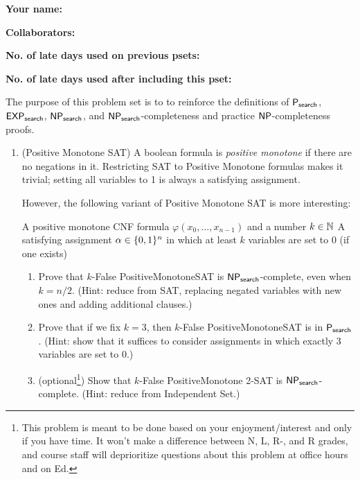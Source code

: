 \documentclass[11pt]{article}
\begin{document}


\textbf{Your name: }

\textbf{Collaborators: }

\textbf{No. of late days used on previous psets: }

\textbf{No. of late days used after including this pset: }

\vspace{1em}

\noindent The purpose of this problem set is to to reinforce the definitions of $\mathsf{P_{search}}$, $\mathsf{EXP_{search}}$, $\mathsf{NP_{search}}$, and $\mathsf{NP_{search}}$-completeness and practice $\mathsf{NP}$-completeness proofs. 

\begin{enumerate}
    \item (Positive Monotone SAT)
    A boolean formula is {\em positive monotone} if there are no negations in it.  Restricting SAT to Positive Monotone formulas makes it trivial; setting all variables to 1 is always a satisfying assignment.
    
    However, the following variant of Positive Monotone SAT is more interesting:
    
        {A positive monotone CNF formula $\varphi(x_0,\ldots,x_{n-1})$ and a number $k\in \mathbb{N}$}
        {A satisfying assignment $\alpha\in\{0,1\}^n$ in which at least $k$ variables are set to 0 (if one exists)}
    
    \begin{enumerate}
        \item Prove that $k$-False PositiveMonotoneSAT is $\mathsf{NP_{search}}$-complete, even when $k=n/2$.  (Hint: reduce from SAT, replacing negated variables with new ones and adding additional clauses.)
        \item Prove that if we fix $k=3$, then $k$-False PositiveMonotoneSAT is in $\mathsf{P_{search}}$. (Hint: show that it suffices to consider assignments in which exactly 3 variables are set to 0.)
        \item (optional\footnote{This problem is meant to be done based on your enjoyment/interest and only if you have time. It won't make a difference between N, L, R-, and R grades, and course staff will deprioritize questions about this problem at office hours and on Ed.}) Show that $k$-False PositiveMonotone 2-SAT is $\mathsf{NP_{search}}$-complete.  (Hint: reduce from Independent Set.)
    \end{enumerate}



\end{enumerate}
\end{document}
